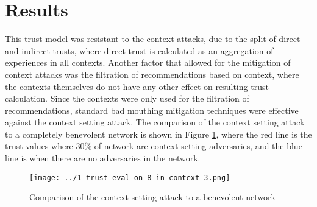 \documentclass{article}
\begin{document}
    \newpage

    \section{Results}
    This trust model was resistant to the context attacks, due to the split of direct and
    indirect trusts, where direct trust is calculated as an aggregation of
    experiences in all contexts. Another factor that allowed for the mitigation
    of context attacks was the filtration of recommendations based on context,
    where the contexts themselves do not have any other effect on resulting
    trust calculation. Since the contexts were only used for the filtration of
    recommendations, standard bad mouthing mitigation techniques were effective
    against the context setting attack. The comparison of the context setting
    attack to a completely benevolent network is shown in Figure \ref{fig:trust_plot}, where the red
    line is the trust values where 30\% of network are context setting adversaries, and
    the blue line is when there are no adversaries in the network.

    \begin{figure}[H]
        \centering
        \texttt{[image: ../1-trust-eval-on-8-in-context-3.png]}
        \caption{Comparison of the context setting attack to a benevolent network}
        \label{fig:trust_plot}
    \end{figure}


    
    
\end{document}
